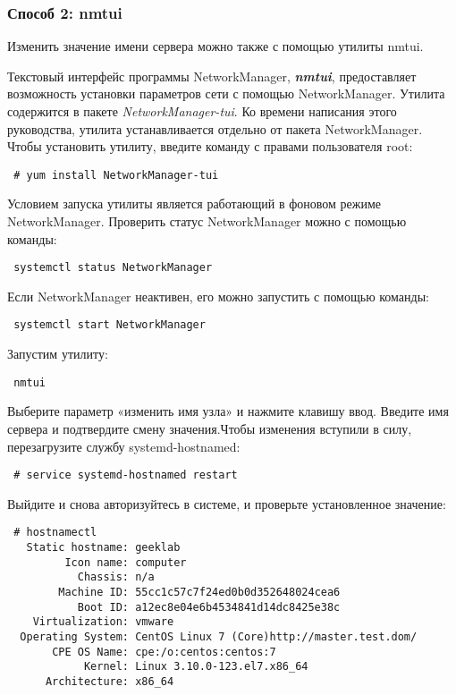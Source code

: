 \documentclass[a4paper,10pt,twoside]{article}
\begin{document}
\subsubsection{}

\subsubsection{Способ 2: nmtui}
Изменить значение имени сервера можно также с помощью утилиты nmtui. 

Текстовый интерфейс программы NetworkManager, \textbf{\textit{nmtui}}, предоставляет возможность установки параметров сети с помощью NetworkManager. Утилита содержится в пакете \textit{NetworkManager-tui}. Ко времени написания этого руководства, утилита устанавливается отдельно от пакета NetworkManager. Чтобы установить утилиту, введите команду с правами пользователя root:
\begin{verbatim}
 # yum install NetworkManager-tui
\end{verbatim}
Условием запуска утилиты является работающий в фоновом режиме NetworkManager. Проверить статус NetworkManager можно с помощью команды:
\begin{verbatim}
 systemctl status NetworkManager
\end{verbatim}

Если NetworkManager неактивен, его можно запустить с помощью команды:
\begin{verbatim}
 systemctl start NetworkManager
\end{verbatim}

Запустим утилиту:
\begin{verbatim}
 nmtui
\end{verbatim} 

Выберите параметр «изменить имя узла» и нажмите клавишу ввод. Введите имя сервера и подтвердите смену значения.Чтобы изменения вступили в силу, перезагрузите службу systemd-hostnamed:
\begin{verbatim}
 # service systemd-hostnamed restart
\end{verbatim} 

Выйдите и снова авторизуйтесь в системе, и проверьте установленное значение:

\begin{verbatim}
 # hostnamectl
   Static hostname: geeklab
         Icon name: computer
           Chassis: n/a
        Machine ID: 55cc1c57c7f24ed0b0d352648024cea6
           Boot ID: a12ec8e04e6b4534841d14dc8425e38c
    Virtualization: vmware
  Operating System: CentOS Linux 7 (Core)http://master.test.dom/
       CPE OS Name: cpe:/o:centos:centos:7
            Kernel: Linux 3.10.0-123.el7.x86_64
      Architecture: x86_64
\end{verbatim} 
\end{document}
